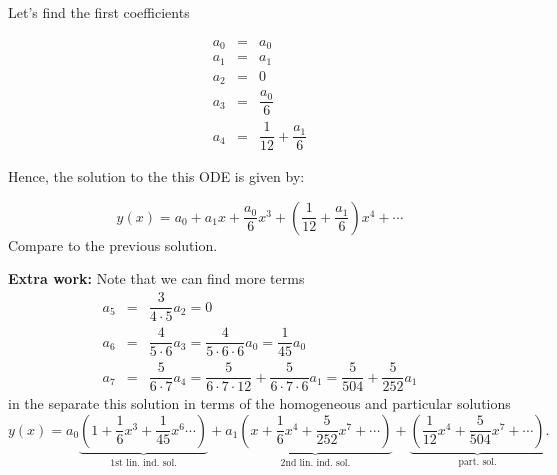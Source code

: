 \documentclass[11pt]{article}
\begin{document}
\begin{solution}
Let's find the first coefficients

\begin{eqnarray*}
a_{0} & = & a_{0} \\
a_{1} & = & a_{1}\\
a_{2} & = & 0 \\
a_{3} & = & \dfrac{a_{0}}{6}  \\
a_{4} & = & \dfrac{1}{12} + \dfrac{a_{1}}{6} 
\end{eqnarray*}

Hence, the solution to the this ODE is given by:

\begin{equation*}
\boxed{y(x) = a_{0} + a_{1}x + \frac{a_{0}}{6}x^{3} + \left(\frac{1}{12} + \frac{a_{1}}{6}\right) x^{4}+\cdots}
\end{equation*}
Compare to the previous solution.

\textbf{Extra work:} Note that we can find more terms
\begin{eqnarray*}
a_{5} & = & \dfrac{3}{4\cdot5}a_{2} = 0  \\
a_{6} & = & \dfrac{4}{5\cdot6}a_{3} = \dfrac{4}{5\cdot 6\cdot 6}a_{0} = \dfrac{1}{45}a_{0}  \\
a_{7} & = & \dfrac{5}{6\cdot7}a_{4} = \dfrac{5}{6\cdot 7\cdot 12} + \dfrac{5}{6\cdot 7\cdot 6}a_{1} = \dfrac{5}{504} + \dfrac{5}{252}a_{1} 
\end{eqnarray*}
in the separate this solution in terms of the homogeneous and particular solutions
\begin{equation*}
\boxed{y(x) = a_{0}\underbrace{\left(1+\frac{1}{6}x^{3}+ \frac{1}{45}x^{6} \cdots\right)}_{\text{1st lin. ind. sol.}} + a_{1}\underbrace{\left(x + \frac{1}{6}x^{4}+\frac{5}{252}x^{7}+\cdots\right)}_{\text{2nd lin. ind. sol.}} + \underbrace{\left(\frac{1}{12}x^{4}+ \frac{5}{504}x^{7}+\cdots\right)}_{\text{part. sol.}}.} 
\end{equation*}
\end{solution}
\end{document}
